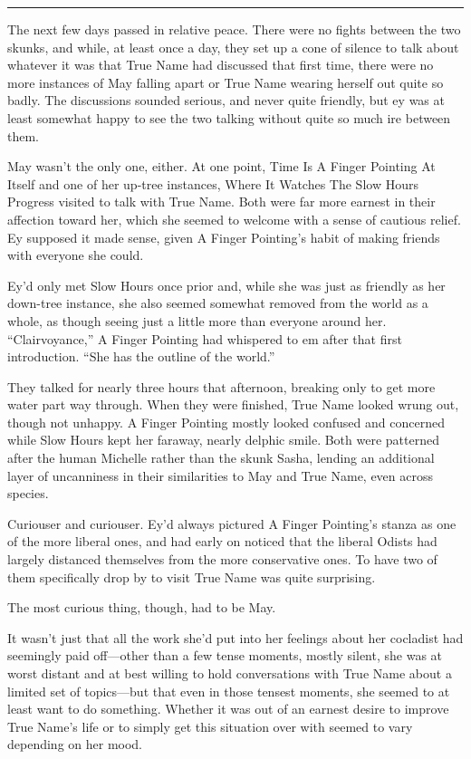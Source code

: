 \begin{center}\rule{0.5\linewidth}{0.5pt}\end{center}

The next few days passed in relative peace. There were no fights between the two skunks, and while, at least once a day, they set up a cone of silence to talk about whatever it was that True Name had discussed that first time, there were no more instances of May falling apart or True Name wearing herself out quite so badly. The discussions sounded serious, and never quite friendly, but ey was at least somewhat happy to see the two talking without quite so much ire between them.

May wasn't the only one, either. At one point, Time Is A Finger Pointing At Itself and one of her up-tree instances, Where It Watches The Slow Hours Progress visited to talk with True Name. Both were far more earnest in their affection toward her, which she seemed to welcome with a sense of cautious relief. Ey supposed it made sense, given A Finger Pointing's habit of making friends with everyone she could.

Ey'd only met Slow Hours once prior and, while she was just as friendly as her down-tree instance, she also seemed somewhat removed from the world as a whole, as though seeing just a little more than everyone around her. ``Clairvoyance,'' A Finger Pointing had whispered to em after that first introduction. ``She has the outline of the world.''

They talked for nearly three hours that afternoon, breaking only to get more water part way through. When they were finished, True Name looked wrung out, though not unhappy. A Finger Pointing mostly looked confused and concerned while Slow Hours kept her faraway, nearly delphic smile. Both were patterned after the human Michelle rather than the skunk Sasha, lending an additional layer of uncanniness in their similarities to May and True Name, even across species.

Curiouser and curiouser. Ey'd always pictured A Finger Pointing's stanza as one of the more liberal ones, and had early on noticed that the liberal Odists had largely distanced themselves from the more conservative ones. To have two of them specifically drop by to visit True Name was quite surprising.

The most curious thing, though, had to be May.

It wasn't just that all the work she'd put into her feelings about her cocladist had seemingly paid off—other than a few tense moments, mostly silent, she was at worst distant and at best willing to hold conversations with True Name about a limited set of topics—but that even in those tensest moments, she seemed to at least want to do something. Whether it was out of an earnest desire to improve True Name's life or to simply get this situation over with seemed to vary depending on her mood.

